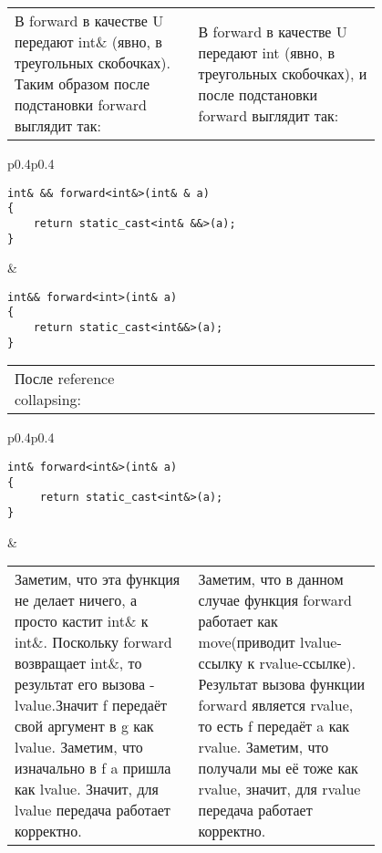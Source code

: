 \begin{center}
\begin{tabular}{p{0.4\linewidth}p{0.4\linewidth}}
В forward в качестве U передают int\& (явно, в треугольных скобочках). Таким образом после подстановки forward выглядит так:
 & В forward в качестве U передают int (явно, в треугольных скобочках), и после подстановки forward выглядит так:
\\
\end{tabular}

\begin{tabular}{p{0.4\linewidth}p{0.4\linewidth}}
\begin{verbatim}
int& && forward<int&>(int& & a)
{
    return static_cast<int& &&>(a);
}
\end{verbatim}
 & \begin{verbatim}
int&& forward<int>(int& a)
{
    return static_cast<int&&>(a);
}

\end{verbatim}
\end{tabular}

\begin{tabular}{p{0.4\linewidth}p{0.4\linewidth}}
После reference collapsing: & \vspace{\baselineskip}\\
\end{tabular}

\begin{tabular}{p{0.4\linewidth}p{0.4\linewidth}}
\begin{verbatim}
int& forward<int&>(int& a)
{
     return static_cast<int&>(a);
}

\end{verbatim}
 & \vspace{\baselineskip}\\
\end{tabular}

\begin{tabular}{p{0.4\linewidth}p{0.4\linewidth}}
Заметим, что эта функция не делает ничего, а просто кастит int\& к int\&. Поскольку forward возвращает int\&, то результат его вызова - lvalue.Значит f передаёт свой аргумент в g как lvalue. Заметим, что изначально в f a пришла как lvalue. Значит, для lvalue передача работает корректно. & Заметим, что в данном случае функция forward работает как move(приводит lvalue-ссылку к rvalue-ссылке). Результат вызова функции forward является rvalue, то есть f передаёт a как rvalue. Заметим, что получали мы её тоже как rvalue, значит, для rvalue передача работает корректно.\\
\end{tabular}

\end{center}

